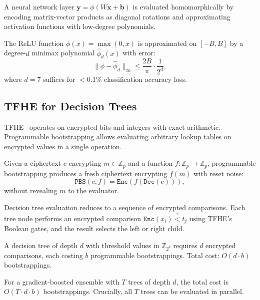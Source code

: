 A neural network layer $\mathbf{y} = \phi(W\mathbf{x} + \mathbf{b})$ is
evaluated homomorphically by encoding matrix-vector products as diagonal
rotations and approximating activation functions with low-degree polynomials.

\begin{proposition}
The ReLU function $\phi(x) = \max(0, x)$ is approximated on $[-B, B]$ by a
degree-$d$ minimax polynomial $\hat{\phi}_d(x)$ with error:
\begin{equation}
\|\phi - \hat{\phi}_d\|_\infty \leq \frac{2B}{\pi} \cdot
\frac{1}{2^d},
\end{equation}
where $d = 7$ suffices for $<$0.1\% classification accuracy loss.
\end{proposition}

\subsection{TFHE for Decision Trees}

TFHE~\cite{tfhe2020} operates on encrypted bits and integers with exact
arithmetic. Programmable bootstrapping allows evaluating arbitrary lookup tables
on encrypted values in a single operation.

\begin{definition}
Given a ciphertext $c$ encrypting $m \in \mathbb{Z}_p$ and a function $f:
\mathbb{Z}_p \to \mathbb{Z}_p$, programmable bootstrapping produces a fresh
ciphertext encrypting $f(m)$ with reset noise:
\begin{equation}
\texttt{PBS}(c, f) = \texttt{Enc}(f(\texttt{Dec}(c))),
\end{equation}
without revealing $m$ to the evaluator.
\end{definition}

Decision tree evaluation reduces to a sequence of encrypted comparisons. Each
tree node performs an encrypted comparison $\texttt{Enc}(x_i) \stackrel{?}{<}
t_j$ using TFHE's Boolean gates, and the result selects the left or right child.

\begin{theorem}
A decision tree of depth $d$ with threshold values in $\mathbb{Z}_{2^b}$
requires $d$ encrypted comparisons, each costing $b$ programmable bootstrappings.
Total cost: $O(d \cdot b)$ bootstrappings.
\end{theorem}

For a gradient-boosted ensemble with $T$ trees of depth $d$, the total cost is
$O(T \cdot d \cdot b)$ bootstrappings. Crucially, all $T$ trees can be
evaluated in parallel.

